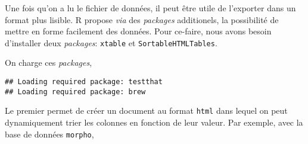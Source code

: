 Une fois qu'on a lu le fichier de données, il peut être utile de l'exporter dans un format plus lisible. R propose \emph{via} des \emph{packages} additionels, la possibilité de mettre en forme facilement des données. Pour ce-faire, nous avons besoin d'installer deux \emph{packages}: \texttt{xtable} et \texttt{SortableHTMLTables}.

\begin{knitrout}
\color{fgcolor}\begin{kframe}
\begin{flushleft}
\ttfamily\noindent
{}\hlkeyword{(}\hlkeyword{(}\hlkeyword{,}{\ }\hlkeyword{)}\hlkeyword{)}\mbox{}
\normalfont
\end{flushleft}
\end{kframe}
\end{knitrout}


On charge ces \emph{packages},

\begin{knitrout}
\color{fgcolor}\begin{kframe}
\begin{flushleft}
\ttfamily\noindent
{}\hlkeyword{(}\hlkeyword{)}\mbox{}
\normalfont
\end{flushleft}
\begin{verbatim}
## Loading required package: testthat
## Loading required package: brew
\end{verbatim}
\begin{flushleft}
\ttfamily\noindent
{}\hlkeyword{(}\hlkeyword{)}\mbox{}
\normalfont
\end{flushleft}
\end{kframe}
\end{knitrout}


Le premier permet de créer un document au format \texttt{html} dans lequel on peut dynamiquement trier les colonnes en fonction de leur valeur. Par exemple, avec la base de données \texttt{morpho},

\begin{knitrout}
\color{fgcolor}\begin{kframe}
\begin{flushleft}
\ttfamily\noindent
{}\hlkeyword{(}\hlargument{=}{\ }\hlkeyword{,}{\ }\hlargument{=}{\ }\hlkeyword{)}\mbox{}
\normalfont
\end{flushleft}
\end{kframe}
\end{knitrout}


